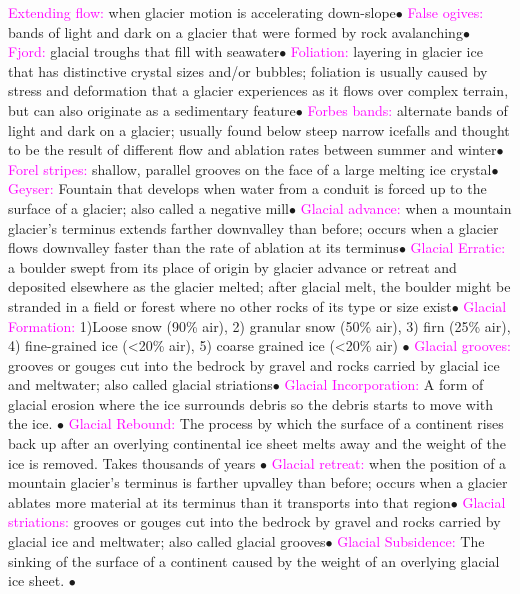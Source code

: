 \documentclass{article}
\newcommand{\ddd}{$\bullet$}
\newcommand{\pink}[1]{\textcolor{magenta}{#1}}
\newcommand{\vocab}[1]{{\pink{#1}}}
\begin{document}
\begin{multicols*}{4}
		\vocab{        Extending flow: } when glacier motion is accelerating down-slope\ddd
		\vocab{        False ogives: } bands of light and dark on a glacier that were formed by rock avalanching\ddd
		\vocab{        Fjord: } glacial troughs that fill with seawater\ddd
		\vocab{        Foliation: } layering in glacier ice that has distinctive crystal sizes and/or bubbles; foliation is usually caused by stress and deformation that a glacier experiences as it flows over complex terrain, but can also originate as a sedimentary feature\ddd
		\vocab{        Forbes bands: } alternate bands of light and dark on a glacier; usually found below steep narrow icefalls and thought to be the result of different flow and ablation rates between summer and winter\ddd
		\vocab{        Forel stripes: } shallow, parallel grooves on the face of a large melting ice crystal\ddd 
		\vocab{        Geyser: } Fountain that develops when water from a conduit is forced up to the surface of a glacier; also called a negative mill\ddd
		\vocab{        Glacial advance: } when a mountain glacier's terminus extends farther downvalley than before; occurs when a glacier flows downvalley faster than the rate of ablation at its terminus\ddd
		\vocab{        Glacial Erratic: } a boulder swept from its place of origin by glacier advance or retreat and deposited elsewhere as the glacier melted; after glacial melt, the boulder might be stranded in a field or forest where no other rocks of its type or size exist\ddd
		\vocab{Glacial Formation: } 1)Loose snow (90\% air), 2) granular snow (50\% air), 3) firn (25\% air), 4) fine-grained ice (<20\% air), 5) coarse grained ice (<20\% air) \ddd
		\vocab{        Glacial grooves: } grooves or gouges cut into the bedrock by gravel and rocks carried by glacial ice and meltwater; also called glacial striations\ddd
		\vocab{Glacial Incorporation: } A form of glacial erosion where the ice surrounds debris so the debris starts to move with the ice. \ddd
		\vocab{Glacial Rebound: } The process by which the surface of a continent rises back up after an overlying continental ice sheet melts away and the weight of the ice is removed. Takes thousands of years \ddd
		\vocab{        Glacial retreat: } when the position of a mountain glacier's terminus is farther upvalley than before; occurs when a glacier ablates more material at its terminus than it transports into that region\ddd
		\vocab{        Glacial striations: } grooves or gouges cut into the bedrock by gravel and rocks carried by glacial ice and meltwater; also called glacial grooves\ddd
		\vocab{Glacial Subsidence: } The sinking of the surface of a continent caused by the weight of an overlying glacial ice sheet. \ddd

\end{multicols*}
\end{document}

